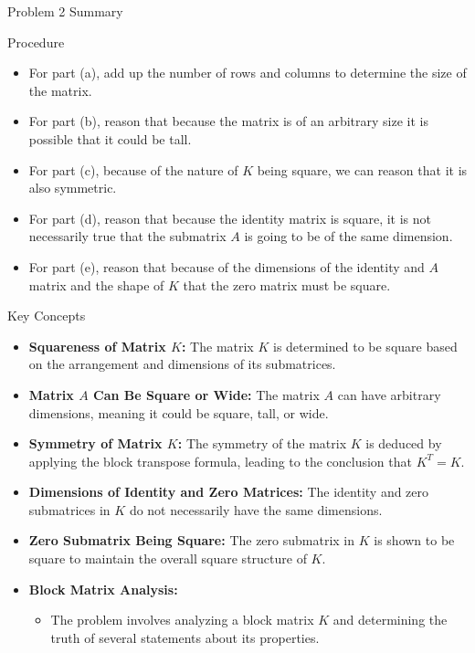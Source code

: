 \begin{summary}{Problem 2 Summary}
    \begin{statement}{Procedure}
        \begin{itemize}
            \item For part (a), add up the number of rows and columns to determine the size of the matrix.
            \item For part (b), reason that because the matrix is of an arbitrary size it is possible that it could be tall.
            \item For part (c), because of the nature of $K$ being square, we can reason that it is also symmetric.
            \item For part (d), reason that because the identity matrix is square, it is not necessarily true that the submatrix $A$ is going to be of the same dimension.
            \item For part (e), reason that because of the dimensions of the identity and $A$ matrix and the shape of $K$ that the zero matrix must be square.
        \end{itemize}
    \end{statement}
    \begin{statement}{Key Concepts}
        \begin{itemize}
            \item \textbf{Squareness of Matrix $K$:} The matrix $K$ is determined to be square based on the arrangement and dimensions of its submatrices.
            \item \textbf{Matrix $A$ Can Be Square or Wide:} The matrix $A$ can have arbitrary dimensions, meaning it could be square, tall, or wide.
            \item \textbf{Symmetry of Matrix $K$:} The symmetry of the matrix $K$ is deduced by applying the block transpose formula, leading to the conclusion that $K^{T} = K$.
            \item \textbf{Dimensions of Identity and Zero Matrices:} The identity and zero submatrices in $K$ do not necessarily have the same dimensions.
            \item \textbf{Zero Submatrix Being Square:} The zero submatrix in $K$ is shown to be square to maintain the overall square structure of $K$.
            \item \textbf{Block Matrix Analysis:}
            \begin{itemize}
                \item The problem involves analyzing a block matrix $K$ and determining the truth of several statements about its properties.

\end{itemize}
\end{itemize}
\end{statement}
\end{summary}
